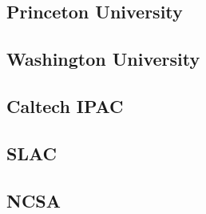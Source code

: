 \subsection {Princeton University}\label{sect:princeton}
\subsection {Washington University}\label{sect:uw}
\subsection {Caltech IPAC}\label{sect:ipac}
\subsection {SLAC}\label{sect:slac}
\subsection {NCSA}\label{sect:ncsa}

